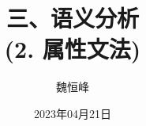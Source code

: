 \documentclass[]{beamer}
\title[语义分析]{三、语义分析 \\ (2. 属性文法)}
\author[魏恒峰]{\large 魏恒峰}
\institute{hfwei@nju.edu.cn}
\date{2023年04月21日}
\begin{document}
\maketitle




\thankyou{}

\end{document}

